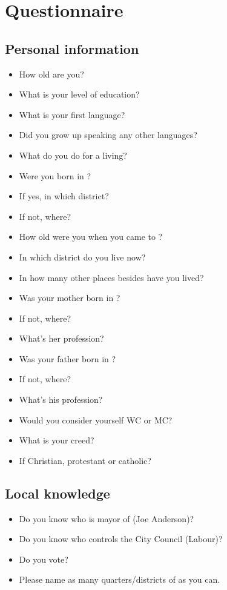 \chapter{Questionnaire}
	\label{app.questionnaire}
	
	\section*{Personal information}
		\begin{multicols}{2}
		\begin{itemize}
			\item How old are you?
			\item What is your level of education? 
			\item What is your first language?
			\item Did you grow up speaking any other languages?
			\item What do you do for a living?
			\item Were you born in ?
			\item If yes, in which district?
			\item If not, where?
			\item How old were you when you came to ?
			\item In which district do you live now?
			\item In how many other places besides  have you lived?
			\item Was your mother born in ?
			\item If not, where?
			\item What's her profession?
			\item Was your father born in ?
			\item If not, where?
			\item What's his profession?
			\item Would you consider yourself WC or MC?
			\item What is your creed?
			\item If Christian, protestant or catholic?
		\end{itemize}
	\end{multicols}
	
	\section*{Local knowledge}
	\begin{multicols}{2}
		\begin{itemize}
			\item Do you know who is mayor of  (Joe Anderson)?
			\item Do you know who controls the City Council (Labour)?
			\item Do you vote?
			\item Please name as many quarters/districts of  as you can.
		\end{itemize}
	\end{multicols}
	

